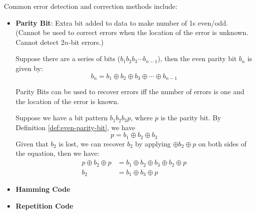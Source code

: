 Common error detection and correction methods include:
\begin{itemize}
    \item \textbf{Parity Bit}: Extra bit added to data to make number of 1s even/odd.
        (Cannot be used to correct errors when the location of the error is unknown.
        Cannot detect 2$n$-bit errors.)
        \begin{definition}\label{def:even-parity-bit}
            Suppose there are a series of bits ($b_1b_2b_3\cdots b_{n-1}$), then the even
            parity bit $b_n$ is given by:
            \begin{equation*}
                b_n = b_1 \oplus b_2 \oplus b_3 \oplus \cdots \oplus b_{n-1}
            \end{equation*}
        \end{definition}
        \begin{theorem}
            Parity Bits can be used to recover errors iff the number of errors is one
            and the location of the error is known.
            \begin{example} \label{ex:parity-bit-error-correction}
\makeatletter
                {\normalfont\sffamily\bfseries{}\p@{}\p@\relax [\ref*{ex:parity-bit-error-correction}]}
\makeatother

                Suppose we have a bit pattern $b_1b_2b_3p$, where $p$ is the parity bit.
                By Definition \ref{def:even-parity-bit}, we have \[p = b_1 \oplus b_2 \oplus b_3\]
                Given that $b_2$ is lost, we can recover $b_2$ by applying $\oplus b_2 \oplus p$ on
                both sides of the equation, then we have:
                \begin{align*}
                    p\oplus b_2 \oplus p &= b_1 \oplus b_2 \oplus b_3 \oplus b_2 \oplus p \\
                    b_2 &= \boxed{b_1 \oplus b_3 \oplus p}
                \end{align*}
            \end{example}       
        \end{theorem}
    \item \textbf{Hamming Code}
    \item \textbf{Repetition Code}
\end{itemize}